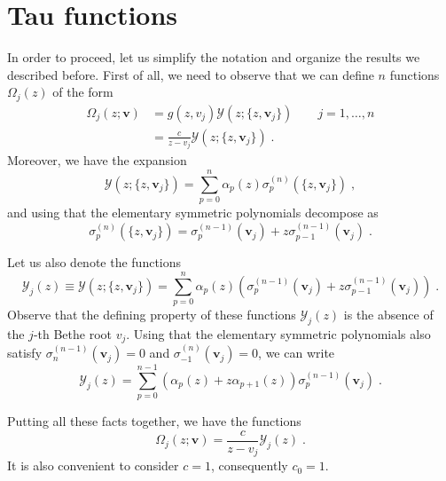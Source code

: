 \documentclass[a4paper,12pt]{amsart}
\begin{document}
\section{Tau functions}

In order to proceed, let us simplify the notation and organize the
results we described before. First of all, we need to observe
that we can define \(n\) functions \(\Omega_j(z)\) of the form
\begin{equation}
\begin{split}
  \Omega_{j}(z; \bm{v}) & = g(z, v_j) \mathcal{Y}(z; \{z, \bm{v}_j\})\qquad j =1, \dots, n\\
   & = \frac{c}{z - v_j} \mathcal{Y}(z; \{z, \bm{v}_j\})\; .
\end{split}
\end{equation}
Moreover, we have the expansion 
\begin{equation}
  \mathcal{Y}(z; \{z,\bm{v}_j\}) = \sum_{p=0}^n \alpha_p(z) \sigma_p^{(n)}(\{z,\bm{v}_j\})\; , 
\end{equation}
and using that the elementary symmetric polynomials decompose as
\begin{equation}
  \sigma_p^{(n)}(\{z,\bm{v}_j\}) = \sigma_p^{(n-1)}(\bm{v}_j) + z \sigma_{p-1}^{(n-1)}(\bm{v}_j) \; . 
\end{equation}

Let us also denote the functions
\begin{equation}
  \label{eq:y-functions-alpha}
  \mathcal{Y}_j(z)  \equiv  \mathcal{Y}(z; \{z,\bm{v}_j\})  = 
\sum_{p=0}^{n} \alpha_p(z)
  \left(\sigma_p^{(n-1)}(\bm{v}_j) + z \sigma_{p-1}^{(n-1)}(\bm{v}_j) \right) \; .
\end{equation}
Observe that the defining property of these functions
\(\mathcal{Y}_j(z)\) is the absence of the \(j\)-th Bethe root
\(v_j\).
Using that the elementary symmetric polynomials also satisfy \(\sigma_n^{(n-1)}(\bm{v}_j)=0\)
and \(\sigma_{-1}^{(n)}(\bm{v}_j)= 0\), we can write
\begin{equation}
  \label{eq:y-functions}
  \mathcal{Y}_j(z)  = 
  \sum_{p=0}^{n-1} 
   \left(\alpha_p(z) + z \alpha_{p+1}(z) \right) \sigma_p^{(n-1)}(\bm{v}_j) \; .
\end{equation}

Putting all these facts together, we have the functions
\begin{equation}
  \Omega_{j}(z; \bm{v}) = \frac{c}{z - v_j} \mathcal{Y}_j(z) \; .
\end{equation}
It is also convenient to consider \(c=1\), consequently \(c_0=1\).
\end{document}
